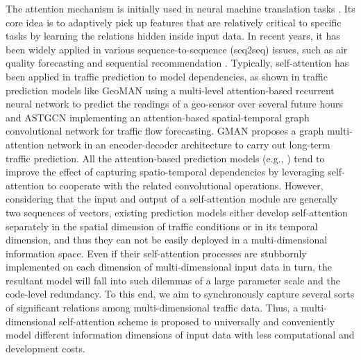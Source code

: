 The attention mechanism is initially used in neural machine translation tasks \cite{bahdanau2014neural}. Its core idea is to adaptively pick up features that are relatively critical to specific tasks by learning the relations hidden inside input data. In recent years, it has been widely applied in various sequence-to-sequence (seq2seq) issues, such as air quality forecasting \cite{cheng2018neural} and sequential recommendation \cite{2018CoupledCF}. Typically, self-attention \cite{vaswani2017attention, velivckovic2017graph}  has been applied in traffic prediction to  model dependencies, as shown in traffic prediction models like GeoMAN \cite{liang2018geoman} using a multi-level attention-based recurrent neural network to predict the readings of a geo-sensor over several future hours and ASTGCN \cite{guo2019attention} implementing an attention-based spatial-temporal graph convolutional network for traffic flow forecasting. GMAN \cite{zheng2020gman} proposes a graph multi-attention network in an encoder-decoder architecture to carry out long-term traffic prediction. All the attention-based prediction models (e.g., \cite{liang2018geoman, guo2019attention, zheng2020gman, cai2020traffic, fang2020constgat, park2020st, chen2020multi}) tend to improve the effect of capturing spatio-temporal dependencies by leveraging self-attention to cooperate with the related convolutional operations. However, considering that the input and output of a self-attention module are generally two sequences of vectors, existing prediction models either develop self-attention separately in the spatial dimension of traffic conditions or in its temporal dimension, and thus they can not be easily deployed in a multi-dimensional information space. Even if their self-attention processes are stubbornly implemented on each dimension of multi-dimensional input data in turn, the resultant model will fall into such dilemmas of a large parameter scale and the code-level redundancy. To this end, we aim to synchronously capture several sorts of significant relations among multi-dimensional traffic data. Thus, a multi-dimensional self-attention scheme is proposed to universally and conveniently model different information dimensions of input data with less computational and development costs.

